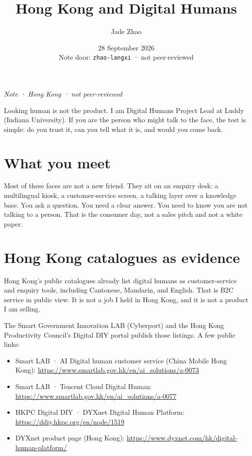 \documentclass[11pt,a4paper]{article}
\title{Hong Kong and Digital Humans}
\author{Jade Zhao}
\date{28 September 2026 \\ \small Note door: \texttt{zhao-langxi} · not peer-reviewed}
\begin{document}
\maketitle

\noindent\textit{Note · Hong Kong · not peer-reviewed}

Looking human is not the product. I am Digital Humans Project Lead at Luddy (Indiana University).
If you are the person who might talk to the face, the test is simple: do you trust it, can you tell what it is, and would you come back.

\section*{What you meet}

Most of these faces are not a new friend. They sit on an enquiry desk: a multilingual kiosk, a customer-service screen, a talking layer over a knowledge base.
You ask a question. You need a clear answer. You need to know you are not talking to a person.
That is the consumer day, not a sales pitch and not a white paper.

\section*{Hong Kong catalogues as evidence}

Hong Kong's public catalogues already list digital humans as customer-service and enquiry tools, including Cantonese, Mandarin, and English.
That is B2C service in public view. It is not a job I held in Hong Kong, and it is not a product I am selling.

The Smart Government Innovation LAB (Cyberport) and the Hong Kong Productivity Council's Digital DIY portal publish those listings. A few public links:

\begin{itemize}
  \item Smart LAB · AI Digital human customer service (China Mobile Hong Kong):
    \url{https://www.smartlab.gov.hk/en/ai_solutions/a-0073}
  \item Smart LAB · Tencent Cloud Digital Human:
    \url{https://www.smartlab.gov.hk/en/ai_solutions/a-0077}
  \item HKPC Digital DIY · DYXnet Digital Human Platform:
    \url{https://ddiy.hkpc.org/en/node/1519}
  \item DYXnet product page (Hong Kong):
    \url{https://www.dyxnet.com/hk/digital-human-platform/}
\end{itemize}
\end{document}
